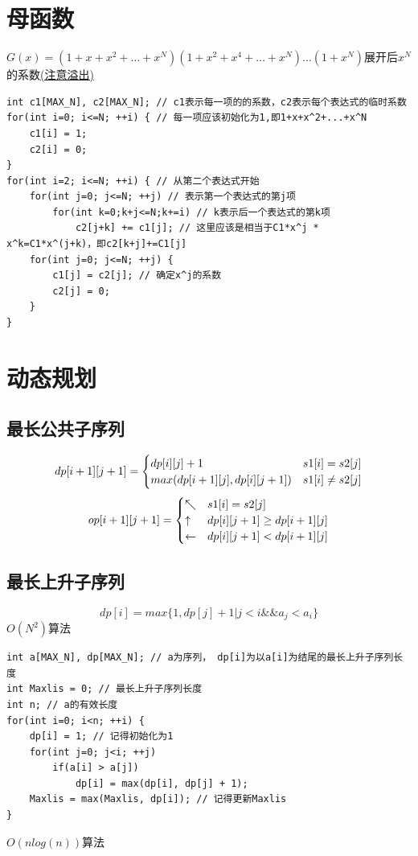 \documentclass[a4paper]{ctexrep}
\begin{document}
\section{母函数}
$G(x)=(1+x+x^2+\dots+x^N)(1+x^2+x^4+\dots+x^N)\dots(1+x^N)$展开后$x^N$的系数\underline{(注意溢出)}\\
\begin{lstlisting}
int c1[MAX_N], c2[MAX_N]; // c1表示每一项的的系数，c2表示每个表达式的临时系数
for(int i=0; i<=N; ++i) { // 每一项应该初始化为1,即1+x+x^2+...+x^N
	c1[i] = 1;
	c2[i] = 0;
}
for(int i=2; i<=N; ++i) { // 从第二个表达式开始
	for(int j=0; j<=N; ++j) // 表示第一个表达式的第j项
		for(int k=0;k+j<=N;k+=i) // k表示后一个表达式的第k项
			c2[j+k] += c1[j]; // 这里应该是相当于C1*x^j * x^k=C1*x^(j+k)，即c2[k+j]+=C1[j]
	for(int j=0; j<=N; ++j) {
		c1[j] = c2[j]; // 确定x^j的系数
		c2[j] = 0;
	}
}
\end{lstlisting}
\section{动态规划}
\subsection{最长公共子序列}
$$
dp[i+1][j+1]=\begin{cases}
	dp[i][j]+1 & s1[i]=s2[j] \cr
	max(dp[i+1][j], dp[i][j+1]) & s1[i] \neq s2[j]
\end{cases}
$$
$$
op[i+1][j+1]=\begin{cases}
	\nwarrow & s1[i]=s2[j] \cr
	\uparrow & dp[i][j+1] \geq dp[i+1][j] \cr
	\leftarrow & dp[i][j+1] < dp[i+1][j] \cr
\end{cases}
$$
\subsection{最长上升子序列}
$$dp[i]=max\{1, dp[j]+1 | j<i \&\& a_j<a_i\}$$
$O(N^2)$算法

\begin{lstlisting}
int a[MAX_N], dp[MAX_N]; // a为序列， dp[i]为以a[i]为结尾的最长上升子序列长度
int Maxlis = 0; // 最长上升子序列长度
int n; // a的有效长度
for(int i=0; i<n; ++i) {
	dp[i] = 1; // 记得初始化为1
	for(int j=0; j<i; ++j)
		if(a[i] > a[j])
			dp[i] = max(dp[i], dp[j] + 1);
	Maxlis = max(Maxlis, dp[i]); // 记得更新Maxlis
}
\end{lstlisting}
$O(n log(n))$算法
\end{document}
